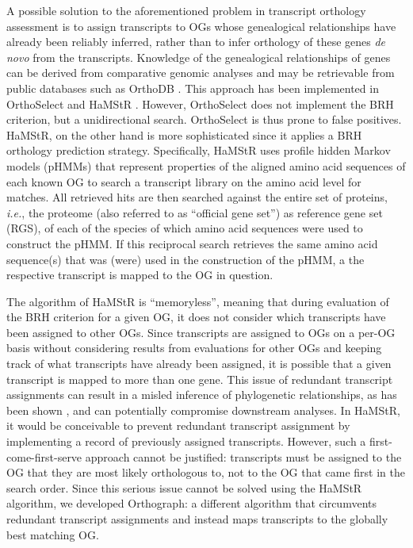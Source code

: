 A possible solution to the aforementioned problem in transcript
orthology assessment is to assign transcripts to OGs whose genealogical
relationships have already been reliably inferred, rather than to infer
orthology of these genes \emph{de novo} from the transcripts. Knowledge
of the genealogical relationships of genes can be derived from
comparative genomic analyses and may be retrievable from public
databases such as OrthoDB \cite{Kriventseva2015}. This approach has been
implemented in OrthoSelect \cite{Schreiber2009} and HaMStR
\cite{Ebersberger2009}. However, OrthoSelect does not implement the BRH
criterion, but a unidirectional search. OrthoSelect is thus prone to
false positives. HaMStR, on the other hand is more sophisticated since
it applies a BRH orthology prediction strategy. Specifically, HaMStR
uses profile hidden Markov models (pHMMs) that represent properties of
the aligned amino acid sequences of each known OG to search a transcript
library on the amino acid level for matches. All retrieved hits are then
searched against the entire set of proteins, \emph{i.e.}, the proteome
(also referred to as ``official gene set'') as reference gene set (RGS),
of each of the species of which amino acid sequences were used to
construct the pHMM. If this reciprocal search retrieves the same amino
acid sequence(s) that was (were) used in the construction of the pHMM, a
the respective transcript is mapped to the OG in question.

The algorithm of HaMStR is ``memoryless'', meaning that during
evaluation of the BRH criterion for a given OG, it does not consider
which transcripts have been assigned to other OGs. Since transcripts are
assigned to OGs on a per-OG basis without considering results from
evaluations for other OGs and keeping track of what transcripts have
already been assigned, it is possible that a given transcript is mapped
to more than one gene. This issue of redundant transcript assignments
can result in a misled inference of phylogenetic relationships, as has
been shown \cite{Struck2011,Kvist2013}, and can potentially compromise
downstream analyses. In HaMStR, it would be conceivable to prevent
redundant transcript assignment by implementing a record of previously
assigned transcripts. However, such a first-come-first-serve approach
cannot be justified: transcripts must be assigned to the OG that they
are most likely orthologous to, not to the OG that came first in the
search order. Since this serious issue cannot be solved using the HaMStR
algorithm, we developed Orthograph: a different algorithm that
circumvents redundant transcript assignments and instead maps
transcripts to the globally best matching OG.

